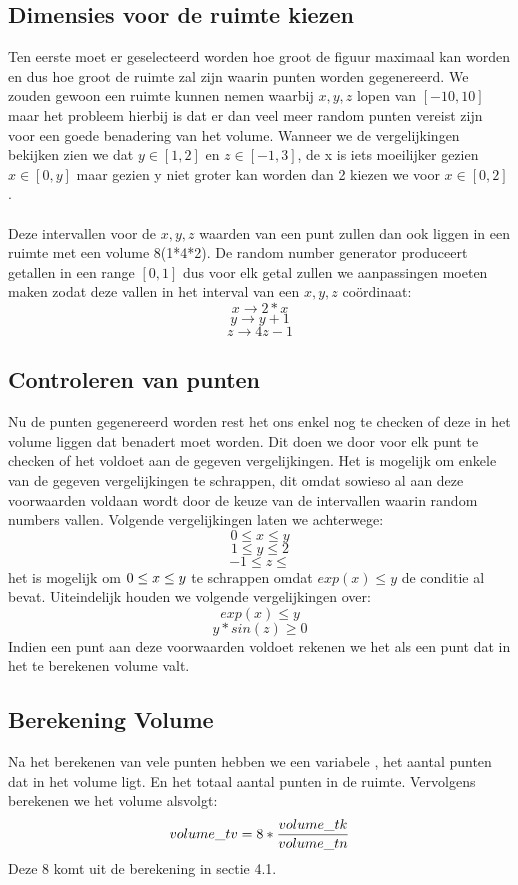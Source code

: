 \documentclass[10pt,a4paper,twocolumn]{article}
\begin{document}
\subsection{Dimensies voor de ruimte kiezen}
Ten eerste moet er geselecteerd worden hoe groot de figuur maximaal kan worden en dus hoe groot de ruimte zal zijn waarin punten worden gegenereerd. We zouden gewoon een ruimte kunnen nemen waarbij $x, y, z$ lopen van $[-10,10]$ maar het probleem hierbij is dat er dan veel meer random punten vereist zijn voor een goede benadering van het volume. Wanneer we de vergelijkingen bekijken zien we dat $y \in [1, 2]$ en $z \in [-1, 3]$, de x is iets moeilijker gezien $x \in [0, y]$ maar gezien y niet groter kan worden dan 2 kiezen we voor $ x \in [0,2]$.
\\
\\
Deze intervallen voor de $x, y, z$ waarden van een punt zullen dan ook liggen in een ruimte met een volume 8(1*4*2). De random number generator produceert getallen in een range $[0,1]$ dus voor elk getal zullen we aanpassingen moeten maken zodat deze vallen in het interval van een $x, y, z$ coördinaat:
 $$ x \rightarrow 2*x $$
 $$ y \rightarrow y + 1$$
 $$ z \rightarrow 4z - 1$$
 \subsection{Controleren van punten}
 Nu de punten gegenereerd worden rest het ons enkel nog te checken of deze in het volume liggen dat benadert moet worden. Dit doen we door voor elk punt te checken of het voldoet aan de gegeven vergelijkingen. Het is mogelijk om enkele van de gegeven vergelijkingen te schrappen, dit omdat sowieso al aan deze voorwaarden voldaan wordt door de keuze van de intervallen waarin random numbers vallen. Volgende vergelijkingen laten we achterwege:
$$0 \leq x \leq y$$
$$1 \leq y \leq 2$$
$$-1 \leq z \leq $$
het is mogelijk om $0 \leq x \leq y\\ $ te schrappen omdat $exp(x) \leq y$ de conditie al bevat. Uiteindelijk houden we volgende vergelijkingen over:
$$exp(x) \leq y$$
$$y*sin(z) \geq 0$$
Indien een punt aan deze voorwaarden voldoet rekenen we het als een punt dat in het te berekenen volume valt.
\subsection{Berekening Volume}
Na het berekenen van vele punten hebben we een variabele  \texttt{}, het aantal punten dat in het volume ligt. En  \texttt{} het totaal aantal punten in de ruimte. Vervolgens berekenen we het volume  \texttt{} alsvolgt:
$$volume\char`_tv = 8*\frac{volume\char`_tk }{volume\char`_tn }$$
Deze 8 komt uit de berekening in sectie 4.1.
\end{document}
